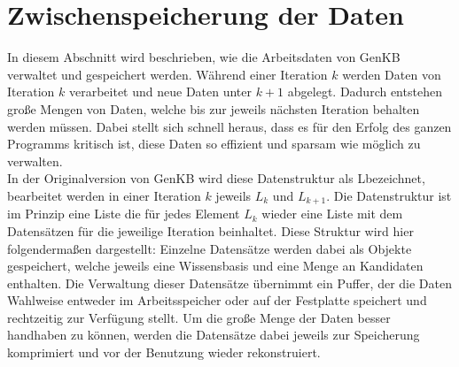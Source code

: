 \documentclass[12pt,a4paper]{article}
\begin{document}
\section{Zwischenspeicherung der Daten}
In diesem Abschnitt wird beschrieben, wie die Arbeitsdaten von GenKB verwaltet und gespeichert werden. Während einer Iteration $k$ werden Daten von Iteration $k$ verarbeitet und neue Daten unter $k + 1$ abgelegt. Dadurch entstehen große Mengen von Daten, welche bis zur jeweils nächsten Iteration behalten werden müssen. Dabei stellt sich schnell heraus, dass es für den Erfolg des ganzen Programms kritisch ist, diese Daten so effizient und sparsam wie möglich zu verwalten. \\
In der Originalversion von GenKB wird diese Datenstruktur als \glqq L\grqq \space bezeichnet, bearbeitet werden in einer Iteration $k$ jeweils $L_k$ und  $L_{k+1}$. Die Datenstruktur ist im Prinzip eine Liste die für jedes Element $L_k$ wieder eine Liste mit dem Datensätzen für die jeweilige Iteration beinhaltet. Diese Struktur wird hier folgendermaßen dargestellt: Einzelne Datensätze werden dabei als Objekte gespeichert, welche jeweils eine Wissensbasis und eine Menge an Kandidaten enthalten. Die Verwaltung dieser Datensätze übernimmt ein Puffer, der die Daten Wahlweise entweder im Arbeitsspeicher oder auf der Festplatte speichert und rechtzeitig zur Verfügung stellt. Um die große Menge der Daten besser handhaben zu können, werden die Datensätze dabei jeweils zur Speicherung komprimiert und vor der Benutzung wieder rekonstruiert.
\end{document}
